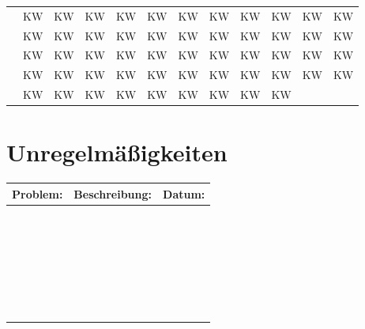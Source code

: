 \documentclass[landscape]{\basedir/fablab-document}
\newcommand{\head}{\bfseries \LARGE}
\newcounter{kw}
\newcommand{\kw}{KW\arabic{kw} \stepcounter{kw}}
\begin{document}
\begin{tabularx}{\textwidth}{|X||l|l|l|l|l|l|l|l|l|l|l|}
	\hline
	& \kw & \kw & \kw & \kw & \kw & \kw & \kw & \kw & \kw & \kw & \kw	\\ \cline{2-12}
	& \kw & \kw & \kw & \kw & \kw & \kw & \kw & \kw & \kw & \kw & \kw	\\ \cline{2-12}
	& \kw & \kw & \kw & \kw & \kw & \kw & \kw & \kw & \kw & \kw & \kw	\\ \cline{2-12}
	& \kw & \kw & \kw & \kw & \kw & \kw & \kw & \kw & \kw & \kw & \kw	\\ \cline{2-12}
	& \kw & \kw & \kw & \kw & \kw & \kw & \kw & \kw & \kw &		&		\\ \hline
\end{tabularx}

\pagebreak

\section*{Unregelmäßigkeiten}

\begin{tabularx}{\textwidth}{|l|X|r|}
	\hline
	\head Problem:	& \head Beschreibung:	& \head Datum:	\\ \hline \hline
					&						&				\\ \hline
					&						&				\\ \hline
					&						&				\\ \hline
					&						&				\\ \hline
					&						&				\\ \hline
					&						&				\\ \hline
					&						&				\\ \hline
					&						&				\\ \hline
					&						&				\\ \hline
					&						&				\\ \hline
					&						&				\\ \hline
					&						&				\\ \hline
					&						&				\\ \hline
					&						&				\\ \hline
					&						&				\\ \hline
					&						&				\\ \hline
					&						&				\\ \hline
					&						&				\\ \hline
					&						&				\\ \hline
					&						&				\\ \hline
					&						&				\\ \hline
					&						&				\\ \hline
					&						&				\\ \hline
					&						&				\\ \hline
					&						&				\\ \hline
					&						&				\\ \hline
					&						&				\\ \hline
					&						&				\\ \hline
\end{tabularx}
\end{document}
